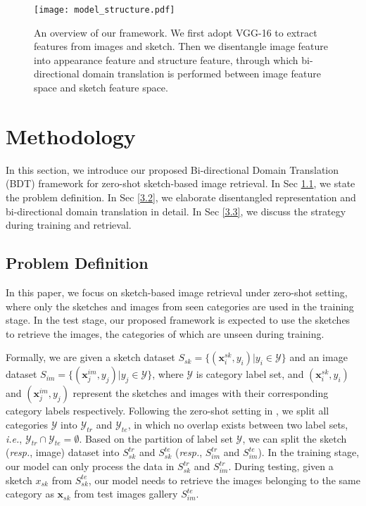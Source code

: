\documentclass[10pt,twocolumn,letterpaper]{article}
\begin{document}
\begin{figure*}
\centering
\texttt{[image: model\_structure.pdf]}   
\caption{An overview of our framework. We first adopt VGG-16 \cite{simonyan2014very} to extract features from images and sketch. Then we disentangle image feature into appearance feature and structure feature, through which bi-directional domain translation is performed between image feature space and sketch feature space.}
\label{fig:structure}
\vspace{-10pt}
\end{figure*}

\section{Methodology}
In this section, we introduce our proposed Bi-directional Domain Translation (BDT) framework for zero-shot sketch-based image retrieval. In Sec \ref{3.1}, we state the problem definition. In Sec \ref{3.2}, we elaborate disentangled representation and bi-directional domain translation in detail. In Sec \ref{3.3}, we discuss the strategy during training and retrieval.

\subsection{Problem Definition} \label{3.1}
In this paper, we focus on sketch-based image retrieval under zero-shot setting, where only the sketches and images from seen categories are used in the training stage. 
In the test stage, our proposed framework is expected to use the sketches to retrieve the images, the categories of which are unseen during training.

Formally, we are given a sketch dataset $S_{sk}=\{(\mathbf{x}_i^{sk}, y_i)|y_i \in \mathcal{Y}\}$ and an image dataset $S_{im}=\{(\mathbf{x}_j^{im}, y_j) | y_j \in \mathcal{Y}\}$, where $\mathcal{Y}$ is category label set, and $(\mathbf{x}_i^{sk}, y_i)$ and $(\mathbf{x}_j^{im}, y_j)$ represent the sketches and images with their corresponding category labels respectively.
Following the zero-shot setting in \cite{yelamarthi2018zero,wang2019stacked}, we split all categories $\mathcal{Y}$ into $\mathcal{Y}_{tr}$ and $\mathcal{Y}_{te}$, in which no overlap exists between two label sets, \emph{i.e.}, $\mathcal{Y}_{tr} \cap \mathcal{Y}_{te} = \emptyset$. 
Based on the partition of label set $\mathcal{Y}$, we can split the sketch (\emph{resp.}, image) dataset into $S^{tr}_{sk}$ and $S^{te}_{sk}$ (\emph{resp.}, $S^{tr}_{im}$ and $S^{te}_{im}$).
In the training stage, our model can only process the data in $S^{tr}_{sk}$ and $S_{im}^{tr}$. 
During testing, given a sketch $x_{sk}$ from $S^{te}_{sk}$, our model needs to retrieve the images belonging to the same category as $\mathbf{x}_{sk}$ from test images gallery $S^{te}_{im}$.
\end{document}
